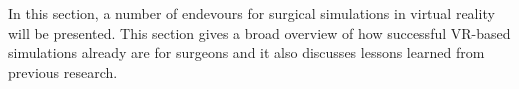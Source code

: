 In this section, a number of endevours for surgical simulations in virtual reality will be presented.
This section gives a broad overview of how successful VR-based simulations already are for surgeons
and it also discusses lessons learned from previous research.

